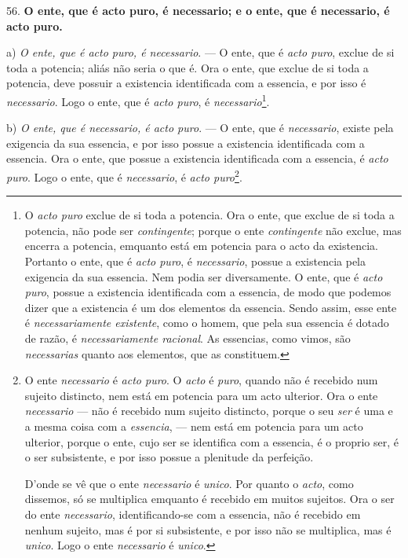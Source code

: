 
56. \textbf{O ente, que é acto puro, é necessario; e o ente, que é necessario, é acto puro.}

a) \emph{O ente, que é acto puro, é necessario}. --- O ente, que é \emph{acto puro}, exclue de si toda a potencia; aliás não seria o que é. Ora o ente, que exclue de si toda a potencia, deve possuir a existencia identificada com a essencia, e por isso é \emph{necessario}. Logo o ente, que é \emph{acto puro}, é \emph{necessario}\footnote{O \emph{acto puro} exclue de si toda a potencia. Ora o ente, que exclue de si toda a potencia, não pode ser \emph{contingente}; porque o ente \emph{contingente} não exclue, mas encerra a potencia, emquanto está em potencia para o acto da existencia. Portanto o ente, que é \emph{acto puro}, é \emph{necessario}, possue a existencia pela exigencia da sua essencia. Nem podia ser diversamente. O ente, que é \emph{acto puro}, possue a existencia identificada com a essencia, de modo que podemos dizer que a existencia é um dos elementos da essencia. Sendo assim, esse ente é \emph{necessariamente existente}, como o homem, que pela sua essencia é dotado de razão, é \emph{necessariamente racional}. As essencias, como vimos, são \emph{necessarias} quanto aos elementos, que as constituem.}.

b) \emph{O ente, que é necessario, é acto puro}. --- O ente, que é \emph{necessario}, existe pela exigencia da sua essencia, e por isso possue a existencia identificada com a essencia. Ora o ente, que possue a existencia identificada com a essencia, é \emph{acto puro}. Logo o ente, que é \emph{necessario}, é \emph{acto puro}\footnote{O ente \emph{necessario} é \emph{acto puro}. O \emph{acto} é \emph{puro}, quando não é recebido num sujeito distincto, nem está em potencia para um acto ulterior. Ora o ente \emph{necessario} --- não é recebido num sujeito distincto, porque o seu \emph{ser} é uma e a mesma coisa com a \emph{essencia}, --- nem está em potencia para um acto ulterior, porque o ente, cujo ser se identifica com a essencia, é o proprio ser, é o ser subsistente, e por isso possue a plenitude da perfeição.\par D'onde se vê que o ente \emph{necessario} é \emph{unico}. Por quanto o \emph{acto}, como dissemos, só se multiplica emquanto é recebido em muitos sujeitos. Ora o ser do ente \emph{necessario}, identificando-se com a essencia, não é recebido em nenhum sujeito, mas é por si subsistente, e por isso não se multiplica, mas é \emph{unico}. Logo o ente \emph{necessario} é \emph{unico}.}.

